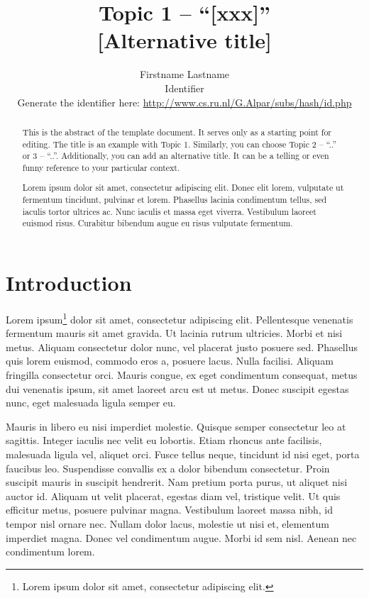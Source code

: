 \documentclass[a4paper, 10pt, conference]{ieeeconf}
\title{Topic 1 -- ``[xxx]''
	\\{[Alternative title]}} %
\author{Firstname Lastname \\
  Identifier 
  \\ \tiny{Generate the identifier here: \url{http://www.cs.ru.nl/G.Alpar/subs/hash/id.php}} %
}
\begin{document}
\maketitle
\thispagestyle{empty}
\pagestyle{empty}


\begin{abstract}

This is the abstract of the template document. It serves only as a starting point for editing. The title is an example with Topic 1. Similarly, you can choose Topic 2 -- ``..'' or 3 -- ``..''. Additionally, you can add an alternative title. It can be a telling or even funny reference to your particular context.

Lorem ipsum dolor sit amet, consectetur adipiscing elit. Donec elit lorem, vulputate ut fermentum tincidunt, pulvinar et lorem. Phasellus lacinia condimentum tellus, sed iaculis tortor ultrices ac. Nunc iaculis et massa eget viverra. Vestibulum laoreet euismod risus. Curabitur bibendum augue eu risus vulputate fermentum.

\end{abstract}


\section{Introduction}

Lorem ipsum\footnote{Lorem ipsum dolor sit amet, consectetur adipiscing elit.} dolor sit amet, consectetur adipiscing elit. Pellentesque venenatis fermentum mauris sit amet gravida. Ut lacinia rutrum ultricies. Morbi et nisi metus. Aliquam consectetur dolor nunc, vel placerat justo posuere sed. Phasellus quis lorem euismod, commodo eros a, posuere lacus. Nulla facilisi. Aliquam fringilla consectetur orci. Mauris congue, ex eget condimentum consequat, metus dui venenatis ipsum, sit amet laoreet arcu est ut metus. Donec suscipit egestas nunc, eget malesuada ligula semper eu.

Mauris in libero eu nisi imperdiet molestie. Quisque semper consectetur leo at sagittis. Integer iaculis nec velit eu lobortis. Etiam rhoncus ante facilisis, malesuada ligula vel, aliquet orci. Fusce tellus neque, tincidunt id nisi eget, porta faucibus leo. Suspendisse convallis ex a dolor bibendum consectetur. Proin suscipit mauris in suscipit hendrerit. Nam pretium porta purus, ut aliquet nisi auctor id. Aliquam ut velit placerat, egestas diam vel, tristique velit. Ut quis efficitur metus, posuere pulvinar magna. Vestibulum laoreet massa nibh, id tempor nisl ornare nec. Nullam dolor lacus, molestie ut nisi et, elementum imperdiet magna. Donec vel condimentum augue. Morbi id sem nisl. Aenean nec condimentum lorem.
\end{document}
